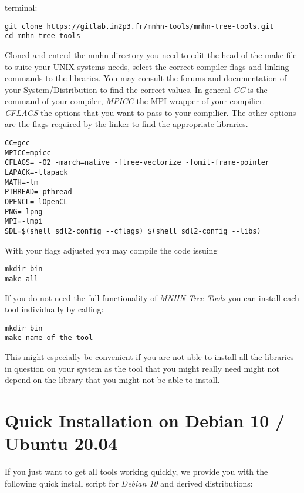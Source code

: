 terminal:
\begin{lstlisting}                                                              
git clone https://gitlab.in2p3.fr/mnhn-tools/mnhn-tree-tools.git
cd mnhn-tree-tools
\end{lstlisting}
Cloned and enterd the mnhn directory you need to edit the head of the
make file to suite your UNIX systems needs, select the correct compiler
flags and linking commands to the libraries. You may consult the
forums and documentation of your System/Distribution to find the
correct values. In general \emph{CC} is the command of your compiler,
\emph{MPICC} the MPI wrapper of your compilier. \emph{CFLAGS} the
options that you want to pass to your compilier. The other options are
the flags required by the linker to find the appropriate libraries.
\begin{lstlisting}                                                           
CC=gcc
MPICC=mpicc
CFLAGS= -O2 -march=native -ftree-vectorize -fomit-frame-pointer 
LAPACK=-llapack
MATH=-lm
PTHREAD=-pthread
OPENCL=-lOpenCL
PNG=-lpng
MPI=-lmpi
SDL=$(shell sdl2-config --cflags) $(shell sdl2-config --libs)
\end{lstlisting}
With your flags adjusted you may compile the code issuing
\begin{lstlisting}
mkdir bin
make all
\end{lstlisting}
If you do not need the full functionality of \emph{MNHN-Tree-Tools} you can
install each tool individually by calling:
\begin{lstlisting}
mkdir bin
make name-of-the-tool
\end{lstlisting}
This might especially be convenient if you are not able to install all
the libraries in question on your system as the tool that you might
really need might not depend on the library that you might not be able
to install.

\section{Quick Installation on Debian 10 / Ubuntu 20.04}
If you just want to get all tools working quickly, we provide you with the
following quick install script for \emph{Debian 10} and derived distributions:


